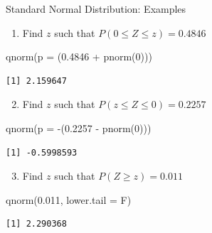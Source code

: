 \documentclass[
  ignorenonframetext,
]{beamer}
\newenvironment{Shaded}{\begin{snugshade}}{\end{snugshade}}
\newcommand{\AttributeTok}[1]{\textcolor[rgb]{0.40,0.45,0.13}{#1}}
\newcommand{\DecValTok}[1]{\textcolor[rgb]{0.68,0.00,0.00}{#1}}
\newcommand{\FloatTok}[1]{\textcolor[rgb]{0.68,0.00,0.00}{#1}}
\newcommand{\FunctionTok}[1]{\textcolor[rgb]{0.28,0.35,0.67}{#1}}
\newcommand{\NormalTok}[1]{\textcolor[rgb]{0.00,0.23,0.31}{#1}}
\newcommand{\SpecialCharTok}[1]{\textcolor[rgb]{0.37,0.37,0.37}{#1}}
\providecommand{\tightlist}{%
  \setlength{\itemsep}{0pt}\setlength{\parskip}{0pt}}
\begin{document}
\begin{frame}[fragile]{Standard Normal Distribution: Examples}
\protect{}\label{standard-normal-distribution-examples-1}
\begin{enumerate}
\tightlist
\item
  Find \(z\) such that \(P(0 \leq Z \leq z) = 0.4846\)
\end{enumerate}

\begin{Shaded}
\begin{Highlighting}[]
\FunctionTok{qnorm}\NormalTok{(}\AttributeTok{p =}\NormalTok{ (}\FloatTok{0.4846} \SpecialCharTok{+} \FunctionTok{pnorm}\NormalTok{(}\DecValTok{0}\NormalTok{)))}
\end{Highlighting}
\end{Shaded}

\begin{verbatim}
[1] 2.159647
\end{verbatim}

\begin{enumerate}
\setcounter{enumi}{1}
\tightlist
\item
  Find \(z\) such that \(P(z \leq Z \leq 0) = 0.2257\)
\end{enumerate}

\begin{Shaded}
\begin{Highlighting}[]
\FunctionTok{qnorm}\NormalTok{(}\AttributeTok{p =} \SpecialCharTok{{-}}\NormalTok{(}\FloatTok{0.2257} \SpecialCharTok{{-}} \FunctionTok{pnorm}\NormalTok{(}\DecValTok{0}\NormalTok{)))}
\end{Highlighting}
\end{Shaded}

\begin{verbatim}
[1] -0.5998593
\end{verbatim}

\begin{enumerate}
\setcounter{enumi}{2}
\tightlist
\item
  Find \(z\) such that \(P(Z \geq z) = 0.011\)
\end{enumerate}

\begin{Shaded}
\begin{Highlighting}[]
\FunctionTok{qnorm}\NormalTok{(}\FloatTok{0.011}\NormalTok{, }\AttributeTok{lower.tail =}\NormalTok{ F)}
\end{Highlighting}
\end{Shaded}

\begin{verbatim}
[1] 2.290368
\end{verbatim}
\end{frame}
\end{document}
